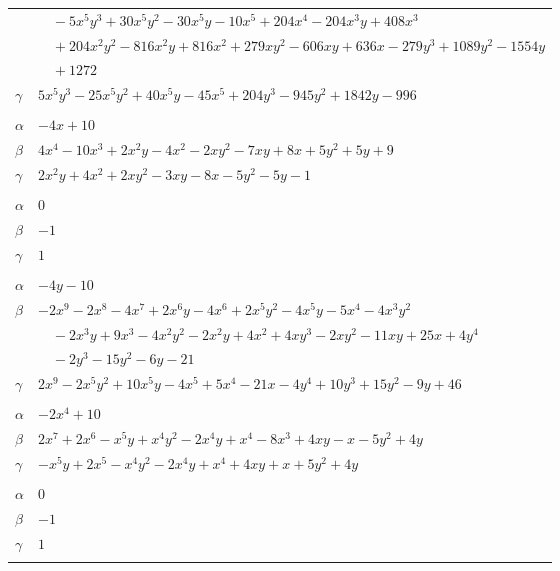 \documentclass[11pt]{article}
\begin{document}
\begin{longtable}{@{}ll@{}}
 & $\quad -5x^{5}y^{3}+30x^{5}y^{2}-30x^{5}y-10x^{5}+204x^{4}-204x^{3}y+408x^{3}$\\
 & $\quad +204x^{2}y^{2}-816x^{2}y+816x^{2}+279xy^{2}-606xy+636x-279y^{3}+1089y^{2}-1554y$\\
 & $\quad +1272$\\
$\gamma$ & $5x^{5}y^{3}-25x^{5}y^{2}+40x^{5}y-45x^{5}+204y^{3}-945y^{2}+1842y-996$\\
\addlinespace[3pt]
\multicolumn{2}{@{}l}{$\{i,j\}=\{17,27\}$, $k_{ij}=2\cdot 3\cdot 7$}\\
$\alpha$ & $-4x+10$\\
$\beta$ & $4x^{4}-10x^{3}+2x^{2}y-4x^{2}-2xy^{2}-7xy+8x+5y^{2}+5y+9$\\
$\gamma$ & $2x^{2}y+4x^{2}+2xy^{2}-3xy-8x-5y^{2}-5y-1$\\
\addlinespace[3pt]
\multicolumn{2}{@{}l}{$\{i,j\}=\{17,33\}$, $k_{ij}=2$}\\
$\alpha$ & $0$\\
$\beta$ & $-1$\\
$\gamma$ & $1$\\
\addlinespace[3pt]
\multicolumn{2}{@{}l}{$\{i,j\}=\{18,20\}$, $k_{ij}=2\cdot 3$}\\
$\alpha$ & $-4y-10$\\
$\beta$ & $-2x^{9}-2x^{8}-4x^{7}+2x^{6}y-4x^{6}+2x^{5}y^{2}-4x^{5}y-5x^{4}-4x^{3}y^{2}$\\
 & $\quad -2x^{3}y+9x^{3}-4x^{2}y^{2}-2x^{2}y+4x^{2}+4xy^{3}-2xy^{2}-11xy+25x+4y^{4}$\\
 & $\quad -2y^{3}-15y^{2}-6y-21$\\
$\gamma$ & $2x^{9}-2x^{5}y^{2}+10x^{5}y-4x^{5}+5x^{4}-21x-4y^{4}+10y^{3}+15y^{2}-9y+46$\\
\addlinespace[3pt]
\multicolumn{2}{@{}l}{$\{i,j\}=\{18,22\}$, $k_{ij}=2^{3}\cdot 5$}\\
$\alpha$ & $-2x^{4}+10$\\
$\beta$ & $2x^{7}+2x^{6}-x^{5}y+x^{4}y^{2}-2x^{4}y+x^{4}-8x^{3}+4xy-x-5y^{2}+4y$\\
$\gamma$ & $-x^{5}y+2x^{5}-x^{4}y^{2}-2x^{4}y+x^{4}+4xy+x+5y^{2}+4y$\\
\addlinespace[3pt]
\multicolumn{2}{@{}l}{$\{i,j\}=\{18,26\}$, $k_{ij}=1$}\\
$\alpha$ & $0$\\
$\beta$ & $-1$\\
$\gamma$ & $1$\\
\addlinespace[3pt]
\multicolumn{2}{@{}l}{$\{i,j\}=\{18,34\}$, $k_{ij}=3^{2}\cdot 7\cdot 11\cdot 17$}\\

\end{longtable}
\end{document}

